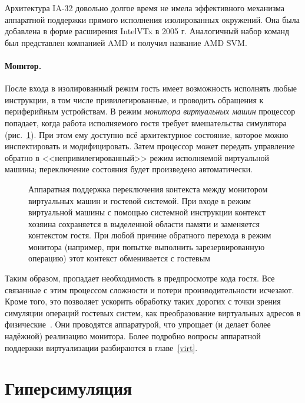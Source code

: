 Архитектура IA-32 довольно долгое время не имела эффективного механизма аппаратной поддержки прямого исполнения изолированных окружений. Она была добавлена в форме расширения Intel\textregistered VTx в 2005 г. Аналогичный набор команд был представлен компанией AMD и получил название AMD SVM.

\paragraph{Монитор.} После входа в изолированный режим гость имеет возможность исполнять любые инструкции, в том числе привилегированные, и проводить обращения к периферийным устройствам. 
В режим \textit{монитора виртуальных машин} процессор попадает, когда работа исполняемого гостя требует вмешательства симулятора (рис.~\ref{fig:vm-assist}). При этом ему доступно всё архитектурное состояние, которое можно инспектировать и модифицировать. Затем процессор может передать управление обратно в <<непривилегированный>> режим исполняемой виртуальной машины; переключение состояния будет произведено автоматически.

\begin{figure}[htb]
    \centering
    \caption[Аппаратная поддержка переключения контекста между монитором виртуальных машин и гостевой системой]{Аппаратная поддержка переключения контекста между монитором виртуальных машин и гостевой системой. При входе в режим виртуальной машины с помощью системной инструкции контекст хозяина сохраняется в выделенной области памяти и заменяется контекстом гостя. При любой причине обратного перехода в режим монитора (например, при попытке выполнить зарезервированную операцию) этот контекст обменивается с гостевым}
    \label{fig:vm-assist}
\end{figure}

Таким образом, пропадает необходимость в предпросмотре кода гостя. Все связанные с этим процессом сложности и потери производительности исчезают. Кроме того, это позволяет ускорить обработку таких дорогих с точки зрения симуляции операций гостевых систем, как преобразование виртуальных адресов в физические~\cite{ulrich-virt-cost}. Они проводятся аппаратурой, что упрощает (и делает более надёжной) реализацию монитора.  Более подробно вопросы аппаратной поддержки виртуализации разбираются в главе~\ref{virt}.

\section{Гиперсимуляция}\label{sec:hypersim}

